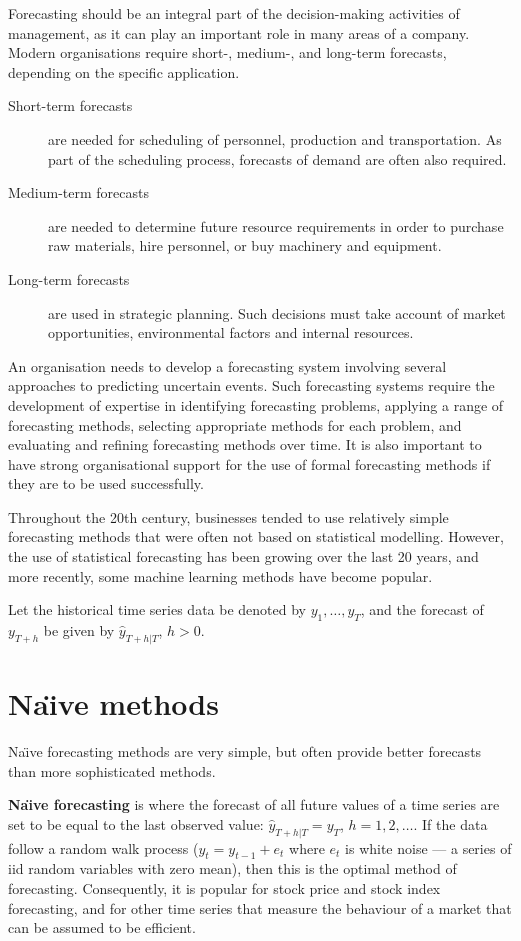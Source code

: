 \documentclass[a4paper,10pt]{article}
\begin{document}
Forecasting should be an integral part of the decision-making activities of management, as it can play an important role in many areas of a company. Modern organisations require short-, medium-, and long-term forecasts, depending on the specific application.
\begin{description}
	\item[Short-term forecasts] are needed for scheduling of personnel, production and transportation. As part of the scheduling process, forecasts of demand are often also required.
	\item[Medium-term forecasts] are needed to determine future resource requirements in order to purchase raw materials, hire personnel, or buy machinery and equipment.
	\item[Long-term forecasts] are used in strategic planning. Such decisions must take account of market opportunities, environmental factors and internal resources.
\end{description}
An organisation needs to develop a forecasting system involving several approaches to predicting uncertain events. Such forecasting systems require the development of expertise in identifying forecasting problems, applying a range of forecasting methods, selecting appropriate methods for each problem, and evaluating and refining forecasting methods over time. It is also important to have strong organisational support for the use of formal forecasting methods if they are to be used successfully.

Throughout the 20th century, businesses tended to use relatively simple forecasting methods that were often not based on statistical modelling. However, the use of statistical forecasting has been growing over the last 20 years, and more recently, some machine learning methods have become popular.

Let the historical time series data be denoted by $y_1,\dots,y_T$, and the forecast of $y_{T+h}$ be given by $\hat{y}_{T+h|T}$, $h>0$.

\section{Na\"{\i}ve methods}

Na\"{\i}ve forecasting methods are very simple, but often provide better forecasts than more sophisticated methods.

\textbf{Na\"{\i}ve forecasting} is where the forecast of all future values of a time series are set to be equal to the last observed value: $\hat{y}_{T+h|T}=y_T$, $h=1,2,\dots$. If the data follow a random walk process ($y_t=y_{t-1}+e_t$ where $e_t$ is white noise --- a series of iid random variables with zero mean), then this is the optimal method of forecasting. Consequently, it is popular for stock price and stock index forecasting, and for other time series that measure the behaviour of a market that can be assumed to be efficient.
\end{document}
